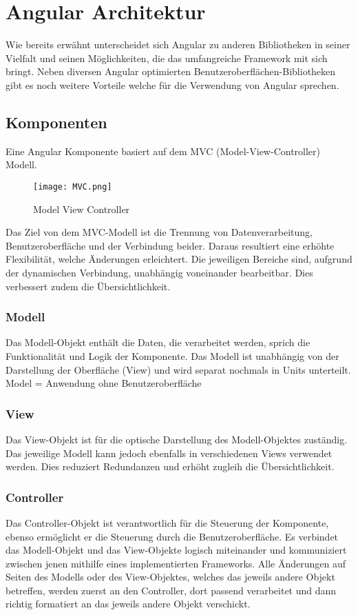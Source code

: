 \section{Angular Architektur}
Wie bereits erwähnt unterscheidet sich Angular zu anderen Bibliotheken in seiner Vielfalt und seinen Möglichkeiten, die das umfangreiche Framework mit sich bringt. Neben diversen Angular optimierten Benutzeroberflächen-Bibliotheken gibt es noch weitere Vorteile welche für die Verwendung von Angular sprechen.
\subsection{Komponenten}
Eine Angular Komponente basiert auf dem MVC (Model-View-Controller)\cite{ModelViewController} Modell.
\begin{figure}[H] \centering \texttt{[image: MVC.png]} \caption{Model View Controller} \end{figure}
Das Ziel von dem MVC-Modell ist die Trennung von Datenverarbeitung, Benutzeroberfläche und der Verbindung beider. Daraus resultiert eine erhöhte Flexibilität, welche Änderungen erleichtert. Die jeweiligen Bereiche sind, aufgrund der dynamischen Verbindung, unabhängig voneinander bearbeitbar. Dies verbessert zudem die Übersichtlichkeit.
\subsubsection{Modell}
Das Modell-Objekt enthält die Daten, die verarbeitet werden, sprich die Funktionalität und Logik der Komponente. Das Modell ist unabhängig von der Darstellung der Oberfläche (View) und wird separat nochmals in Units unterteilt.
Model = Anwendung ohne Benutzeroberfläche
\subsubsection{View}
Das View-Objekt ist für die optische Darstellung des Modell-Objektes zuständig. Das jeweilige Modell kann jedoch ebenfalls in verschiedenen Views verwendet werden. Dies reduziert Redundanzen und erhöht zugleih die Übersichtlichkeit.
\subsubsection{Controller}
Das Controller-Objekt ist verantwortlich für die Steuerung der Komponente, ebenso ermöglicht er die Steuerung durch die Benutzeroberfläche. Es verbindet das Modell-Objekt und das View-Objekte logisch miteinander und kommuniziert zwischen jenen mithilfe eines implementierten Frameworks. Alle Änderungen auf Seiten des Modells oder des View-Objektes, welches das jeweils andere Objekt betreffen, werden zuerst an den Controller, dort passend verarbeitet und dann richtig formatiert an das jeweils andere Objekt verschickt.


